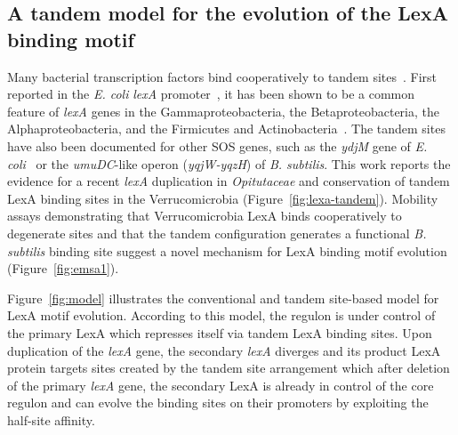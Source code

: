 \subsection{A tandem model for the evolution of the LexA binding motif}

Many bacterial transcription factors bind cooperatively to tandem
sites~\citep{barnard2004regulation}. First reported in the \textit{E. coli}
\textit{lexA} promoter~\citep{brent1982regulation}, it has been shown to be a
common feature of \textit{lexA} genes in the Gammaproteobacteria, the
Betaproteobacteria, the Alphaproteobacteria, and the Firmicutes and
Actinobacteria~\citep{sanchez2012analysis, cornish2012inference}. The tandem
sites have also been documented for other SOS genes, such as the \textit{ydjM}
gene of \textit{E. coli}~\citep{fernandez2000identification} or the
\textit{umuDC}-like operon (\textit{yqjW-yqzH}) of
\textit{B. subtilis}\citep{au2005genetic}. This work reports the evidence for a
recent \textit{lexA} duplication in \textit{Opitutaceae} and conservation of
tandem LexA binding sites in the Verrucomicrobia
(Figure~\ref{fig:lexa-tandem}). Mobility assays demonstrating that
Verrucomicrobia LexA binds cooperatively to degenerate sites and that the
tandem configuration generates a functional \textit{B. subtilis} binding site
suggest a novel mechanism for LexA binding motif evolution
(Figure~\ref{fig:emsa1}).

Figure~\ref{fig:model} illustrates the conventional and tandem site-based model
for LexA motif evolution. According to this model, the regulon is under control
of the primary LexA which represses itself via tandem LexA binding sites. Upon
duplication of the \textit{lexA} gene, the secondary \textit{lexA} diverges and
its product LexA protein targets sites created by the tandem site arrangement
which after deletion of the primary \textit{lexA} gene, the secondary LexA is
already in control of the core regulon and can evolve the binding sites on
their promoters by exploiting the half-site affinity.

